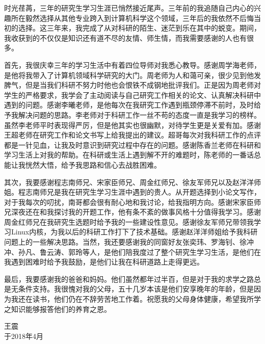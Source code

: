 \begin{acknowledgements}
时光荏苒，三年的研究生学习生涯已悄然接近尾声。三年前的我追随自己内心的兴趣所在毅然选择从其他专业跨入到计算机科学这个领域，三年后的我依然不后悔当初的选择。这三年来，我完成了从对科研的陌生、迷茫到乐在其中的蜕变。期间，我收获到的不仅仅是知识还有道不尽的友情、师生情，而我需要感谢的人也有很多。

首先，我很庆幸三年的学习生活中有着四位导师对我悉心教导。感谢周学海老师，是他将我带入了计算机领域科学研究的大门。周老师为人和蔼可亲，很少见到他发脾气，但是当我们科研不努力时他也会恨铁不成钢地批评我们。正是因为周老师对学生的严格要求，我学会了主动阅读与自己研究工作相关的论文、认真解决科研中遇到的问题。感谢李曦老师，是他每次在我研究工作遇到瓶颈停滞不前时，及时给予我解决问题的思路。李老师对于科研工作一丝不苟的态度一直是我学习的榜样。虽然李老师平时表现得严厉，但是他其实也很幽默，对待学生更是关爱有加。感谢王超老师在研究工作和论文书写上给我提出的建议。超哥每次对我科研工作的点评都是一针见血，让我及时意识到研究过程中存在的问题。感谢陈香兰老师在科研和学习生活上对我的帮助。在科研或生活上遇到解不开的难题时，陈老师的一番话总能让我恍然大悟，给予我思路和信心去战胜困难。

其次，我要感谢程志南师兄、宋家臣师兄、周金红师兄、徐友军师兄以及赵洋洋师姐。程志南师兄是我在研究生学习生涯中遇到的贵人。从开题选择到小论文写作，对于我每次的叨扰，南哥都会很有耐心地和我讨论，给我指明方向。感谢宋家臣师兄深夜还在和我探讨我的开题工作，他有条不紊的做事风格十分值得我学习。感谢周金红师兄在我研究生选题时给予我的一些建设性意见。感谢徐友军师兄带领我学习Linux内核，为我以后的科研工作打下了技术基础。感谢赵洋洋师姐给予我科研问题上的一些解决思路。当然，我还要感谢我的同窗好友张奕玮、罗海钊、徐冲冲、孙凡、鲁云涛、郭玲等人，是他们陪我度过了整个研究生学习生活，是他们在我遇到困难时给予我鼓励，是他们让我在科研道路上走得更远。

最后，我要感谢我的爸爸和妈妈。他们虽然都年过半百，但是对于我的求学之路总是无条件支持。我很愧对我的父母，五十几岁本该是他们安享晚年的年龄，但是因为我还在读书，他们仍在不辞劳苦地工作着。祝愿我的父母身体健康，希望我所学之知识能够报答他们的养育之恩。

\begin{flushright}
王震 \\
于2018年4月
\end{flushright}



\end{acknowledgements}
